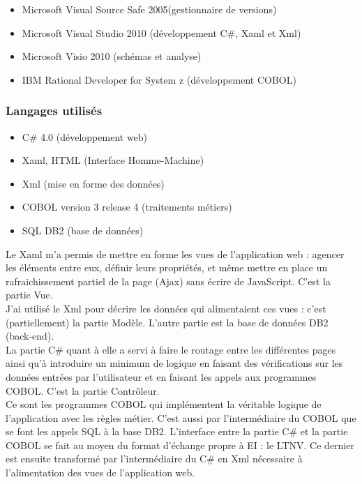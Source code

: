 \documentclass[a4paper,french,8pt]{article}
\begin{document}
			\begin{itemize}
				\item Microsoft Visual Source Safe 2005(gestionnaire de versions)
				\item Microsoft Visual Studio 2010 (développement C\#, Xaml et Xml)
				\item Microsoft Visio 2010 (schémas et analyse)
				\item IBM Rational Developer for System z (développement COBOL)
			\end{itemize}
		
		\subsubsection{Langages utilisés}
			
			\begin{itemize}
				\item C\# 4.0 (développement web)
				\item Xaml, HTML (Interface Homme-Machine)
				\item Xml (mise en forme des données)
				\item COBOL version 3 release 4 (traitements métiers)
				\item SQL DB2 (base de données)
			\end{itemize}
			
			Le Xaml m’a permis de mettre en forme les vues de l’application web : agencer les éléments entre eux, définir leurs propriétés,
			et même mettre en place un rafraichissement partiel de la page (Ajax) sans écrire de JavaScript. C’est la partie Vue.\\
			J’ai utilisé le Xml pour décrire les données qui alimentaient ces vues : c’est (partiellement) la partie Modèle. L’autre partie est la base de données DB2 (back-end).\\
			La partie C\# quant à elle a servi à faire le routage entre les différentes pages ainsi qu’à introduire un minimum de logique en faisant des vérifications sur les données entrées par l'utilisateur 
			et en faisant les appels aux programmes COBOL. C’est la partie Contrôleur.\\ 
						
			Ce sont les programmes COBOL qui implémentent la véritable logique de l’application avec les règles métier.
			C’est aussi par l’intermédiaire du COBOL que se font les appels SQL à la base DB2.
			L’interface entre la partie C\# et la partie COBOL se fait au moyen du format d’échange propre à EI : le LTNV. 
			Ce dernier est ensuite transformé par l’intermédiaire du C\# en Xml nécessaire à l’alimentation des vues de l’application web.\\ 
			
\end{document}
